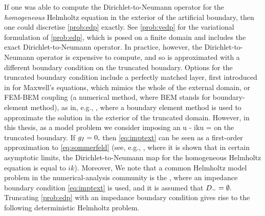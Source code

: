 If one was able to compute the Dirichlet-to-Neumann operator for the \emph{homogeneous} Helmholtz equation in the exterior of the artificial boundary, then one could discretise \cref{prob:edp} exactly. See \cref{prob:vedp} for the variational formulation of \cref{prob:edp}, which is posed on a finite domain and includes the exact Dirichlet-to-Neumann operator. In practice, however, the Dirichlet-to-Neumann operator is expensive to compute, and so is approximated with a different boundary condition on the truncated boundary. Options for the truncated boundary condition include a perfectly matched layer, first introduced in \cite{Be:94} for Maxwell's equations, which mimics the whole of the external domain, or FEM-BEM coupling (a numerical method, where BEM stands for boundary-element method), as in, e.g., \cite{HiMe:06}, where a boundary element method is used to approximate the solution in the exterior of the truncated domain. However, in this thesis, as a model problem we consider imposing an 
\beq\label{eq:imptext}
\dn u - iku = \gI
\eeq
on the truncated boundary. If $g_{I} = 0,$ then \eqref{eq:imptext} can be seen as a first-order approximation to \eqref{eq:sommerfeld} (see, e.g., \cite[p. 353]{GaMuSp:19}, where it is shown that in certain asymptotic limits, the Dirichlet-to-Neumann map for the homogeneous Helmholtz equation is equal to $ik$). Moreover, We note that a common Helmholtz model problem in the numerical-analysis community is the , where an impedance boundary condition \cref{eq:imptext} is used, and it is assumed that $D_{-} = \emptyset.$ Truncating \cref{prob:edp} with an impedance boundary condition gives rise to the following deterministic Helmholtz problem.


